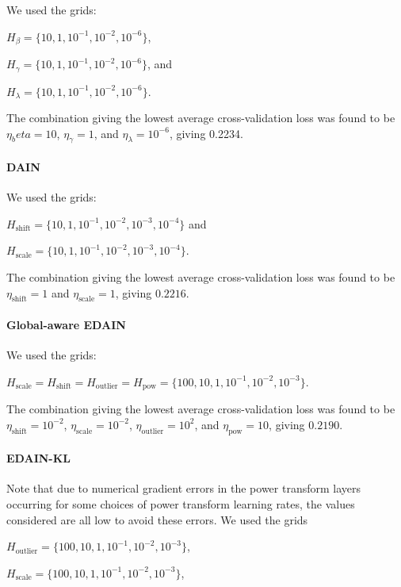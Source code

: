 \documentclass{statsmsc}
\begin{document}
{We used the grids:

$H_{\beta}=\{10,1,10^{-1},10^{-2},10^{-6}\}$,

$H_{\gamma}=\{10,1,10^{-1},10^{-2},10^{-6}\}$, and

$H_{\lambda}=\{10,1,10^{-1},10^{-2},10^{-6}\}$.

The combination giving the lowest average cross-validation loss was found to be
$\eta_beta=10$, $\eta_\gamma=1$, and $\eta_\lambda=10^{-6}$, giving 0.2234.

\paragraph{DAIN}%

We used the grids:

$H_{\textrm{shift}}=\{10,1,10^{-1},10^{-2},10^{-3},10^{-4}\}$ and

$H_{\textrm{scale}}=\{10,1,10^{-1},10^{-2},10^{-3},10^{-4}\}$.

The combination giving the lowest average cross-validation loss was found to be
$\eta_{\textrm{shift}}=1$ and $\eta_{\textrm{scale}}=1$, giving $0.2216$.

\paragraph{Global-aware EDAIN}%

We used the grids:

$H_{\textrm{scale}}=H_{\textrm{shift}}=H_{\textrm{outlier}}=H_{\textrm{pow}}=\{100,
10, 1, 10^{-1}, 10^{-2}, 10^{-3}\}$.

The combination giving the lowest average cross-validation loss was found to be
$\eta_{\textrm{shift}}=10^{-2}$,
$\eta_{\textrm{scale}}=10^{-2}$,
$\eta_{\textrm{outlier}}=10^{2}$, and
$\eta_{\textrm{pow}}=10$, giving $0.2190$.

\paragraph{EDAIN-KL}%

Note that due to numerical gradient errors in the power transform layers occurring for some
choices of power transform learning rates, the values considered are all low to avoid these
errors. We used the grids

$H_{\textrm{outlier}}=\{100, 10, 1, 10^{-1}, 10^{-2}, 10^{-3}\}$,

$H_{\textrm{scale}}=\{100, 10, 1, 10^{-1}, 10^{-2}, 10^{-3}\}$,

}
\end{document}
